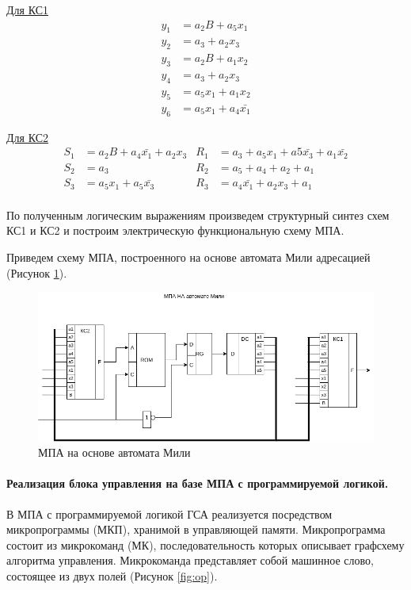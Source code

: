 \documentclass[a4paper,14pt]{extarticle}
\begin{document}
\underline{Для КС1}
\begin{align*}
	y_1 &= a_2 B+a_5x_1 \\
	y_2 & =a_3 + a_2x_3 \\
	y_3 & = a_2B + a_1x_2 \\
	y_4 &=a_3+a_2x_3 \\
	y_5 & =a_5x_1+a_1x_2 \\
	y_6 & = a_5x_1+a_4\bar{x_1}
\end{align*}

\underline{Для КС2}
\begin{align*}
	S_1 &=a_2B+a_4\bar{x_1}+a_2x_3 & R_1 & = a_3+a_5x_1+a5\bar{x_3} + a_1\bar{x_2}\\
	S_2 & =a_3 &  	R_2 & = a_5+ a_4+a_2+a_1\\
	S_3 & = a_5x_1 + a_5\bar{x_3} & R_3 & = a_4\bar{x_1}+ a_2x_3+ a_1\\
\end{align*}
	
	По полученным логическим выражениям произведем структурный синтез схем КС1 и КС2 и построим электрическую функциональную схему МПА.
	
	
	Приведем схему МПА, построенного на основе автомата Мили адресацией (Рисунок \ref{fig:mili-scheme}).
	\begin{figure}[h!]
		\centering
		\includegraphics[width=0.8\linewidth]{images/mili-scheme}
		\caption{МПА на основе автомата Мили}
		\label{fig:mili-scheme}
	\end{figure}
	
	
	\newpage
	\paragraph{Реализация блока управления на базе МПА с программируемой логикой.}
	В МПА с программируемой логикой ГСА реализуется посредством микропрограммы (МКП), хранимой в управляющей памяти. Микропрограмма состоит из микрокоманд (МК), последовательность которых описывает графсхему алгоритма управления. Микрокоманда представляет собой машинное
	слово, состоящее из двух полей (Рисунок \ref{fig:op}). 
	
\end{document}
